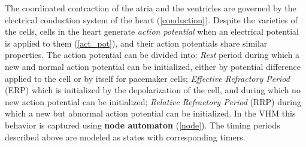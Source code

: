 The coordinated contraction of the atria and the ventricles are governed by the electrical conduction system of the heart (\ref{conduction}). Despite the varieties of the cells, cells in the heart generate \emph{action potential} when an electrical potential is applied to them (\ref{act_pot}), and their action potentials share similar properties. The action potential can be divided into: \emph{Rest} period during which a new and normal action potential can be initialized, either by potential difference applied to the cell or by itself for pacemaker cells; \emph{Effective Refractory Period} (ERP) which is initialized by the depolarization of the cell, and during which no new action potential can be initialized; \emph{Relative Refractory Period} (RRP) during which a new but abnormal action potential can be initialized. In the VHM this behavior is captured using \textbf{node automaton} (\ref{node}). The timing periods described above are modeled as states with corresponding timers. 

